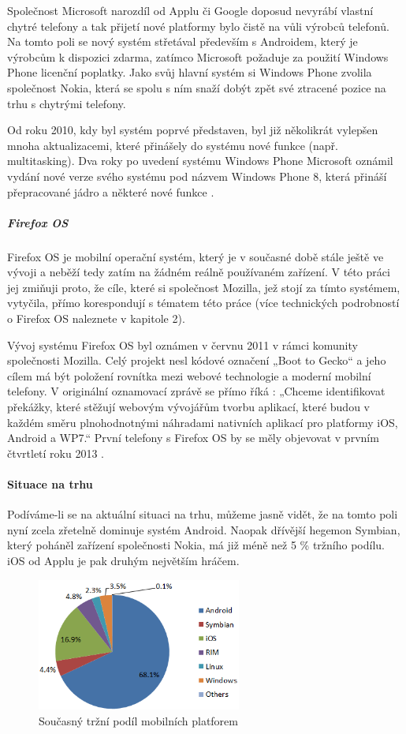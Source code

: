 Společnost Microsoft narozdíl od Applu či Google doposud nevyrábí vlastní chytré telefony a tak přijetí nové platformy bylo čistě na vůli výrobců telefonů. Na tomto poli se nový systém střetával především s Androidem, který je výrobcům k dispozici zdarma, zatímco Microsoft požaduje za použití Windows Phone licenční poplatky. Jako svůj hlavní systém si Windows Phone zvolila společnost Nokia, která se spolu s ním snaží dobýt zpět své ztracené pozice na trhu s chytrými telefony.

Od roku 2010, kdy byl systém poprvé představen, byl již několikrát vylepšen mnoha aktualizacemi, které přinášely do systému nové funkce (např. multitasking). Dva roky po uvedení systému Windows Phone Microsoft oznámil vydání nové verze svého systému pod názvem Windows Phone 8, která přináší přepracované jádro a některé nové funkce \cite{ms_unveils_wp8}.

\subparagraph{Firefox OS}
Firefox OS je mobilní operační systém, který je v současné době stále ještě ve vývoji a neběží tedy zatím na žádném reálně používaném zařízení. V této práci jej zmiňuji proto, že cíle, které si společnost Mozilla, jež stojí za tímto systémem, vytyčila, přímo korespondují s tématem této práce (více technických podrobností o Firefox OS naleznete v kapitole 2).

Vývoj systému Firefox OS byl oznámen v červnu 2011 v rámci komunity společnosti Mozilla. Celý projekt nesl kódové označení „Boot to Gecko“ a jeho cílem má být položení rovnítka mezi webové technologie a moderní mobilní telefony. V originální oznamovací zprávě se přímo říká \cite{booting_to_the_web}: „Chceme identifikovat překážky, které stěžují webovým vývojářům tvorbu aplikací, které budou v každém směru plnohodnotnými náhradami nativních aplikací pro platformy iOS, Android a WP7.“ První telefony s Firefox OS by se měly objevovat v prvním čtvrtletí roku 2013 \cite{ztes_first_firefoxos}.

\paragraph{Situace na trhu}
Podíváme-li se na aktuální situaci na trhu, můžeme jasně vidět, že na tomto poli nyní zcela zřetelně dominuje systém Android. Naopak dřívější hegemon Symbian, který poháněl zařízení společnosti Nokia, má již méně než 5 \% tržního podílu. iOS od Applu je pak druhým největším hráčem.

\begin{figure}\centering
\includegraphics[width=0.6\textwidth]{smartphone_by_platform.png}
\caption{Současný tržní podíl mobilních platforem}
\label{fig:MobilniPlatformyPodil}
\end{figure}

